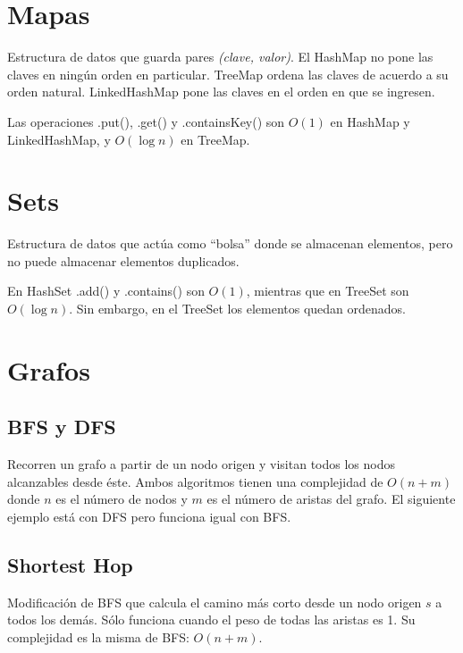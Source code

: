 \documentclass{article}
\begin{document}
\begin{multicols}{2}

\tableofcontents

\section{Mapas}
Estructura de datos que guarda pares \emph{(clave, valor)}. El HashMap no pone las claves en ningún orden en particular. TreeMap ordena las claves de acuerdo a su orden natural. LinkedHashMap pone las claves en el orden en que se ingresen.

Las operaciones .put(), .get() y .containsKey() son \( O(1) \) en HashMap y LinkedHashMap, y \( O(\log n) \) en TreeMap.


\section{Sets}
Estructura de datos que actúa como ``bolsa'' donde se almacenan elementos, pero no puede almacenar elementos duplicados.

En HashSet .add() y .contains() son \( O(1) \), mientras que en TreeSet son \( O(\log n) \). Sin embargo, en el TreeSet los elementos quedan ordenados.


\section{Grafos}
	\subsection{BFS y DFS}
	Recorren un grafo a partir de un nodo origen y visitan todos los nodos alcanzables desde éste. Ambos algoritmos tienen una complejidad de \( O(n + m) \) donde \( n \) es el número de nodos y \( m \) es el número de aristas del grafo. El siguiente ejemplo está con DFS pero funciona igual con BFS.	
	

	\subsection{Shortest Hop}
	Modificación de BFS que calcula el camino más corto desde un nodo origen \( s \) a todos los demás. Sólo funciona cuando el peso de todas las aristas es 1. Su complejidad es la misma de BFS: \( O(n + m) \).
	
	

\end{multicols}
\end{document}
